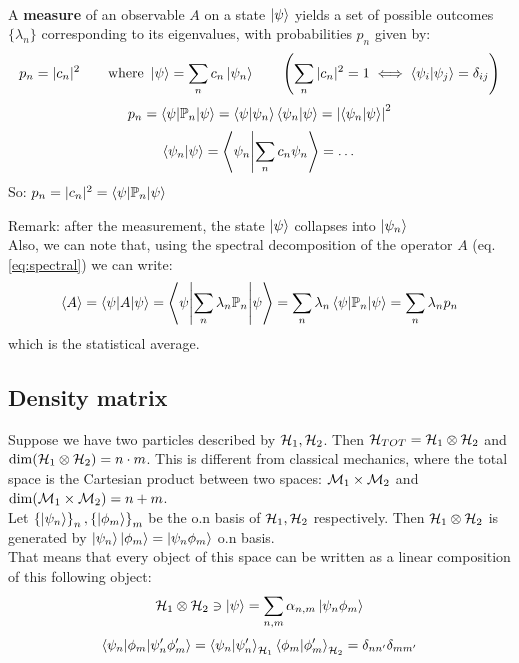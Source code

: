 \\

A \textbf{measure} of an observable $A$ on a state $\left|\psi\right\rangle$ yields a set of possible outcomes $\{\lambda_n\}$ corresponding to its eigenvalues, with probabilities $p_n$ given by: 
$$p_n = |c_n|^2 \qquad \text{where } \left|\psi\right\rangle = \sum_n c_n \left|\psi_n\right\rangle \qquad \left(\sum_n |c_n|^2 = 1 \iff \left\langle \psi_i \middle| \psi_j \right\rangle = \delta_{ij} \right)$$
$$ p_n = \left\langle \psi \middle| \mathbb{P}_n \middle| \psi \right\rangle = \left\langle \psi \middle| \psi_n \right\rangle\left\langle \psi_n \middle| \psi \right\rangle = \left|\left\langle \psi_n \middle| \psi \right\rangle\right|^2$$
$$ \left\langle \psi_n \middle| \psi \right\rangle = \left\langle \psi_n \middle| \sum_n c_n \psi_n \right\rangle = \dots $$
So:  $ p_n = |c_n|^2 = \left\langle \psi \middle| \mathbb{P}_n \middle| \psi \right\rangle$

Remark: after the measurement, the state $\left|\psi\right\rangle$ collapses into $\left|\psi_n\right\rangle$\\

Also, we can note that, using the spectral decomposition of the operator $A$ (eq. \ref{eq:spectral}) we can write:
$$\left<A\right> = \left\langle \psi \middle| A \middle| \psi \right\rangle = \left\langle \psi \middle| \sum_n\lambda_n\mathbb{P}_n \middle| \psi \right\rangle = \sum_n \lambda_n \left\langle \psi \middle| \mathbb{P}_n \middle| \psi \right\rangle = \sum_n \lambda_n p_n$$
which is the statistical average.\\


\subsection{Density matrix}
Suppose we have two particles described by $\mathcal{H}_1, \mathcal{H}_2$. Then $\mathcal{H}_{TOT} = \mathcal{H}_1 \otimes \mathcal{H}_2$ and $\dim(\mathcal{H}_1\otimes\mathcal{H}_2) = n\cdot m$. This is different from classical mechanics, where the total space is the Cartesian product between two spaces: $\mathcal{M}_1 \times \mathcal{M}_2$ and $\dim (\mathcal{M}_1 \times \mathcal{M}_2) = n+m$.\\

Let $\left\{\left|\psi_n\right\rangle\right\}_n, \left\{\left|\phi_m\right\rangle\right\}_m$ be the o.n basis of $\mathcal{H}_1,\mathcal{H}_2$ respectively. Then $\mathcal{H}_1 \otimes \mathcal{H}_2$ is generated by $\left|\psi_n\right\rangle\left|\phi_m\right\rangle = \left|\psi_n\phi_m\right\rangle$ o.n basis.\\
That means that every object of this space can be written as a linear composition of this following object:
$$\mathcal{H}_1 \otimes \mathcal{H}_2 \ni \left|\psi\right\rangle = \sum_{n,m} \alpha_{n,m} \left|\psi_n\phi_m\right\rangle$$
$$\left\langle \psi_n \middle| \phi_m \middle| \psi_n'\phi_m' \right\rangle = \left\langle \psi_n \middle| \psi_n' \right\rangle_{\mathcal{H}_1}\left\langle \phi_m \middle| \phi_m' \right\rangle_{\mathcal{H}_2} = \delta_{nn'}\delta_{mm'}$$

